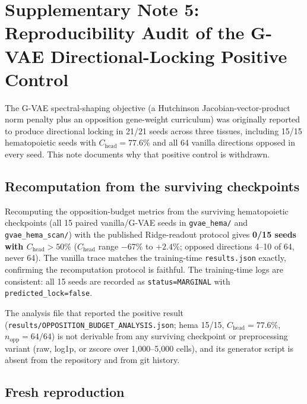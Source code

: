 \documentclass[11pt,a4paper]{article}
\begin{document}
\section*{Supplementary Note 5: Reproducibility Audit of the G-VAE Directional-Locking Positive Control}
\label{sup:opposition_audit}

The G-VAE spectral-shaping objective (a Hutchinson Jacobian-vector-product norm penalty plus an opposition gene-weight curriculum) was originally reported to produce directional locking in 21/21 seeds across three tissues, including 15/15 hematopoietic seeds with $C_{\text{head}}=77.6\%$ and all 64 vanilla directions opposed in every seed. This note documents why that positive control is withdrawn.

\subsection*{Recomputation from the surviving checkpoints}

Recomputing the opposition-budget metrics from the surviving hematopoietic checkpoints (all 15 paired vanilla/G-VAE seeds in \texttt{gvae\_hema/} and \texttt{gvae\_hema\_scan/}) with the published Ridge-readout protocol gives \textbf{0/15 seeds with $C_{\text{head}}>50\%$} ($C_{\text{head}}$ range $-67\%$ to $+2.4\%$; opposed directions 4--10 of 64, never 64). The vanilla trace matches the training-time \texttt{results.json} exactly, confirming the recomputation protocol is faithful. The training-time logs are consistent: all 15 seeds are recorded as \texttt{status=MARGINAL} with \texttt{predicted\_lock=false}.

The analysis file that reported the positive result (\texttt{results/OPPOSITION\_BUDGET\_ANALYSIS.json}; hema 15/15, $C_{\text{head}}=77.6\%$, $n_{\mathrm{opp}}=64/64$) is not derivable from any surviving checkpoint or preprocessing variant (raw, log1p, or zscore over 1{,}000--5{,}000 cells), and its generator script is absent from the repository and from git history.

\subsection*{Fresh reproduction}
\end{document}
